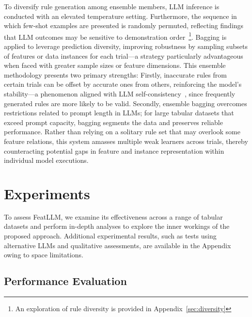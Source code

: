 To diversify rule generation among ensemble members, LLM inference is conducted with an elevated temperature setting. Furthermore, the sequence in which few-shot examples are presented is randomly permuted, reflecting findings that LLM outcomes may be sensitive to demonstration order~\cite{lu2022fantastically}\footnote{An exploration of rule diversity is provided in Appendix~\ref{sec:diversity}}. Bagging is applied to leverage prediction diversity, improving robustness by sampling subsets of features or data instances for each trial—a strategy particularly advantageous when faced with greater sample sizes or feature dimensions. This ensemble methodology presents two primary strengths: Firstly, inaccurate rules from certain trials can be offset by accurate ones from others, reinforcing the model’s stability—a phenomenon aligned with LLM self-consistency~\cite{wang2022self}, since frequently generated rules are more likely to be valid. Secondly, ensemble bagging overcomes restrictions related to prompt length in LLMs; for large tabular datasets that exceed prompt capacity, bagging segments the data and preserves reliable performance. Rather than relying on a solitary rule set that may overlook some feature relations, this system amasses multiple weak learners across trials, thereby counteracting potential gaps in feature and instance representation within individual model executions.

\section{Experiments}
To assess \textsf{FeatLLM}, we examine its effectiveness across a range of tabular datasets and perform in-depth analyses to explore the inner workings of the proposed approach. Additional experimental results, such as tests using alternative LLMs and qualitative assessments, are available in the Appendix owing to space limitations.

\subsection{Performance Evaluation}
